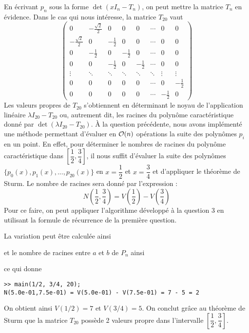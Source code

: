 En écrivant $p_n$ sous la forme $\det(xI_n-T_n)$, on peut mettre la matrice $T_n$ en évidence. Dans le cas qui nous intéresse, la matrice $T_{20}$ vaut
\[
  \begin{pmatrix}
    0 & -\frac{\sqrt{2}}{2} & 0 & 0 & 0 & \cdots & 0 & 0\\
    -\frac{\sqrt{2}}{2} & 0 & -\frac 12 & 0 & 0 & \cdots & 0 & 0\\
    0 & -\frac 12 & 0 & -\frac 12 & 0 & \cdots & 0 & 0\\
    0 & 0 & -\frac 12 & 0 & -\frac 12 & \cdots & 0 & 0\\
    \vdots & \ddots& \ddots& \ddots& \ddots& \ddots & \vdots & \vdots\\
    0 & 0 & 0 & 0 & 0 & \cdots & 0 & -\frac 12\\
    0 & 0 & 0 & 0 & 0 & \cdots & -\frac 12 & 0
  \end{pmatrix}
\]
Les valeurs propres de $T_{20}$ s'obtiennent en déterminant le noyau
de l'application linéaire $\lambda I_{20} - T_{20}$ ou,
autrement dit, les racines du polynôme caractéristique donné par
$\det(\lambda I_{20} - T_{20})$.
À la question précédente, nous avons implémenté une méthode permettant
d'évaluer en $\mathcal{O}(n)$ opérations la suite des polynômes $p_i$ en un point.
En effet, pour déterminer le nombres de racines du polynôme caractéristique
dans $\left[ \dfrac{1}{2} , \dfrac{3}{4} \right]$,
il nous suffit d'évaluer la suite des polynômes
$ \{ p_0(x), p_1(x), ... , p_{20}(x) \}$ en $x=\dfrac{1}{2}$
et $x=\dfrac{3}{4}$ et d'appliquer le théorème de Sturm.
Le nombre de racines sera donné par l'expression :
$$N(\dfrac{1}{2} , \dfrac{3}{4}) = V(\dfrac{1}{2}) - V(\dfrac{3}{4})$$
Pour ce faire, on peut appliquer l'algorithme développé à la question 3
en utilisant la formule de récurrence de la première question.

La variation peut être calculée ainsi

et le nombre de racines entre $a$ et $b$ de $P_n$ ainsi

ce qui donne
\begin{lstlisting}
>> main(1/2, 3/4, 20);
N(5.0e-01,7.5e-01) = V(5.0e-01) - V(7.5e-01) = 7 - 5 = 2
\end{lstlisting}

On obtient ainsi $V(1/2) = 7$ et $V(3/4) = 5$.
On conclut grâce au théorème de Sturm que la matrice $T_{20}$
possède 2 valeurs propre dans l'intervalle
$\left[ \dfrac{1}{2} , \dfrac{3}{4} \right]$.
